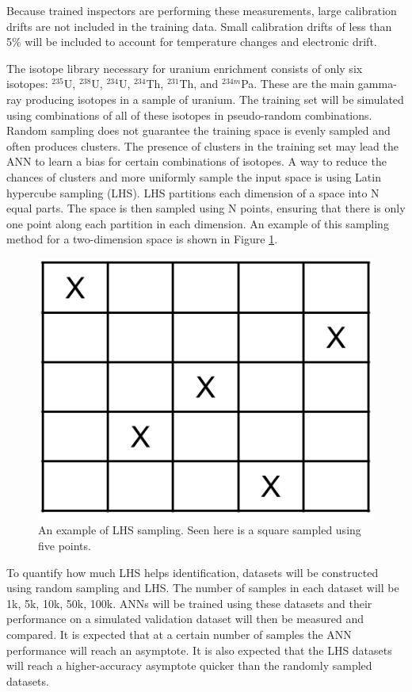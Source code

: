 \documentclass[tocnosub,noragright,centerchapter,12pt,fullpage]{uiucecethesis09}
\begin{document}
Because trained inspectors are performing these measurements, large calibration drifts are not included in the training data. Small calibration drifts of less than 5\% will be included to account for temperature changes and electronic drift.

The isotope library necessary for uranium enrichment consists of only six isotopes: $^{235}$U, $^{238}$U, $^{234}$U, $^{234}$Th, $^{231}$Th, and $^{234m}$Pa. These are the main gamma-ray producing isotopes in a sample of uranium. The training set will be simulated using combinations of all of these isotopes in pseudo-random combinations. Random sampling does not guarantee the training space is evenly sampled and often produces clusters. The presence of clusters in the training set may lead the ANN to learn a bias for certain combinations of isotopes. A way to reduce the chances of clusters and more uniformly sample the input space is using Latin hypercube sampling (LHS). LHS partitions each dimension of a space into N equal parts. The space is then sampled using N points, ensuring that there is only one point along each partition in each dimension. An example of this sampling method for a two-dimension space is shown in Figure \ref{fig:LHS_example}.

\begin{figure}[H]
\centering
\includegraphics[width=0.4\linewidth]{images/LHS_example}
\caption{An example of LHS sampling. Seen here is a square sampled using five points.}
\label{fig:LHS_example}
\end{figure}

To quantify how much LHS helps identification, datasets will be constructed using random sampling and LHS. The number of samples in each dataset will be 1k, 5k, 10k, 50k, 100k. ANNs will be trained using these datasets and their  performance on a simulated validation dataset will then be measured and compared. It is expected that at a certain number of samples the ANN performance will reach an asymptote. It is also expected that the LHS datasets will reach a higher-accuracy asymptote quicker than the randomly sampled datasets. 
\end{document}
